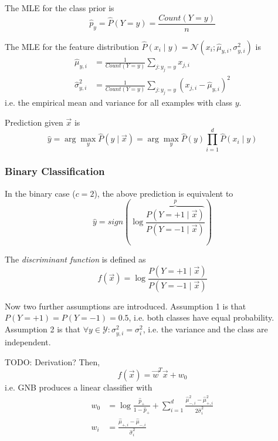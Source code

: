 The MLE for the class prior is
\begin{equation*}
\hat{p}_y = \hat{P}(Y = y)
= \frac{Count(Y = y)}{n}
\end{equation*}

The MLE for the feature distribution
$\hat{P}(x_i \mid y) = \mathcal{N}(x_i; \hat{\mu}_{y, i}, \sigma^2_{y,i})$ is
\begin{align*}
\hat{\mu}_{y,i} &=
\frac{1}{Count(Y = y)}
\sum_{j:y_j = y}{x_{j,i}} \\
\hat{\sigma}^2_{y, i} &=
\frac{1}{Count(Y = y)}
\sum_{j:y_j = y}{(
	x_{j,i} - \hat{\mu}_{y,i}
	)^2}
\end{align*}
i.e. the empirical mean and variance
for all examples with class $y$.

Prediction given $\vec{x}$ is
\begin{equation*}
\hat{y} = \arg\max_y{
	\hat{P}(y \mid \vec{x})
}
= \arg\max_y{
	\hat{P}(y)
	\prod_{i=1}^d{
		\hat{P}(x_i \mid y)
	}
}
\end{equation*}

\subsubsection{Binary Classification}
In the binary case ($c = 2$),
the above prediction is equivalent to
\begin{equation*}
\hat{y} = sign\left( \log{
	\frac{
		\overbrace{P(Y = +1 \mid \vec{x})}^p
	}
	{P(Y = -1 \mid \vec{x})}
}\right)
\end{equation*}

The \emph{discriminant function} is defined as
\begin{equation*}
f(\vec{x}) = \log{\frac
	{P(Y = +1 \mid \vec{x})}
	{P(Y = -1 \mid \vec{x})}
}
\end{equation*}

Now two further assumptions are introduced.
Assumption 1 is that
$P(Y = +1) = P(Y = -1) = 0.5$,
i.e. both classes have equal probability.
Assumption 2 is that
$\forall y \in \mathcal{Y} : \sigma^2_{y,i} = \sigma^2_i$,
i.e. the variance and the class are independent.

TODO: Derivation?
Then,
\begin{equation*}
f(\vec{x}) = \vec{w}^T \vec{x} + w_0
\end{equation*}
i.e. GNB produces a linear classifier with
\begin{align*}
w_0 &= \log{\frac{\hat{p}_+}{1-\hat{p}_+}}
+ \sum_{i=1}^d{
	\frac{\hat{\mu}^2_{-,i} - \hat{\mu}^2_{+, i}}{2\hat{\sigma}^2_i}
} \\
w_i &= \frac
{\hat{\mu}_{+,i} - \hat{\mu}_{-,i}}
{\hat{\sigma}^2_i}
\end{align*}

